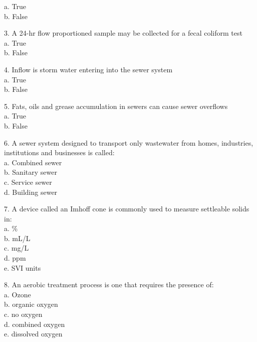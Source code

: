 a. True\\ 
b. False \\
\vspace{0.5cm}


3. A 24-hr flow proportioned sample may be collected for a fecal coliform test\\

a. True \\
b. False \\
\vspace{0.5cm}


4. Inflow is storm water entering into the sewer system\\

a. True \\
b. False \\
\vspace{0.5cm}


5. Fats, oils and grease accumulation in sewers can cause sewer overflows\\

a. True \\
b. False \\

\vspace{0.5cm}

6. A sewer system designed to transport only wastewater from homes, industries, institutions and businesses is called:\\

a. Combined sewer \\
b. Sanitary sewer \\
c. Service sewer \\
d. Building sewer \\

\vspace{0.5cm}

7. A device called an Imhoff cone is commonly used to measure settleable solids in:\\

a. \% \\
b. mL/L \\
c. mg/L \\
d. ppm \\
e. SVI units \\

\vspace{0.5cm}

8. An aerobic treatment process is one that requires the presence of:\\

a. Ozone \\
b. organic oxygen \\
c. no oxygen \\
d. combined oxygen \\
e. dissolved oxygen \\

